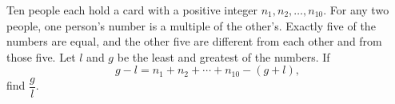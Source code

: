 Ten people each hold a card with a positive integer $n_1,n_2,\dots,n_{10}$. For any two people, one person's number is a multiple of the other's. Exactly five of the numbers are equal, and the other five are different from each other and from those five. Let $l$ and $g$ be the least and greatest of the numbers. If
\[g-l=n_1+n_2+\cdots+n_{10}-(g+l),\]
find $\dfrac gl$.
